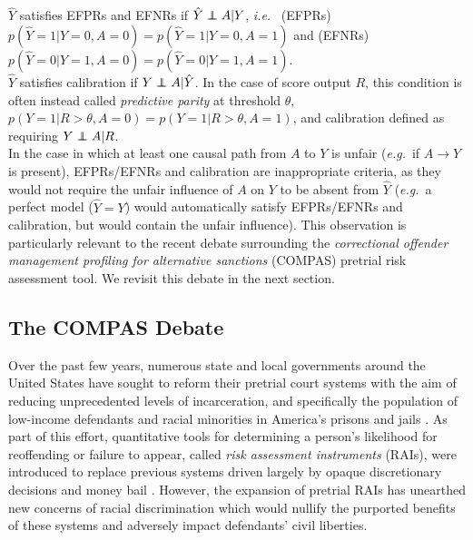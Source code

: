 \documentclass[runningheads]{llncs}
\newcommand\independent{\protect\mathpalette{\protect\independenT}{\perp}}
\def\independenT#1#2{\mathrel{\rlap{$#1#2$}\mkern2mu{#1#2}}}
\newcommand{\ie}{\emph{i.e.}}
\newcommand{\eg}{\emph{e.g.}}
\begin{document}
 $\hat Y$ satisfies EFPRs and EFNRs if $\hat Y \independent A | Y$, \ie~ (EFPRs) $p(\hat Y=1|Y=0,A=0)=p(\hat Y=1|Y=0,A=1)$ and (EFNRs) $p(\hat Y=0|Y=1,A=0)=p(\hat Y=0|Y=1,A=1)$.\\ 

$\hat Y$ satisfies calibration if $Y \independent A | \hat Y$. In the case of score output $R$, this condition is often instead called \emph{predictive parity} at threshold $\theta$, $p(Y=1|R>\theta,A=0)=p(Y=1|R>\theta,A=1)$, and calibration defined as requiring $Y \independent A |R$.\\

In the case in which at least one causal path from $A$ to $Y$ is unfair (\eg~if $A\rightarrow Y$ is present), 
EFPRs/EFNRs and calibration are inappropriate criteria, as they would not require the unfair influence of $A$ on $Y$ to be absent from $\hat Y$ (\eg~a perfect model ($\hat Y = Y$) would automatically satisfy EFPRs/EFNRs and calibration, but would contain the unfair influence). This observation is particularly relevant to the recent debate surrounding the \emph{correctional offender management profiling for alternative sanctions} (COMPAS) pretrial risk assessment tool. We revisit this debate in the next section.

\subsection{The COMPAS Debate \label{sec:COMPAS}}
Over the past few years, numerous state and local governments around the United States have sought to reform their pretrial court systems with the aim of reducing unprecedented levels of incarceration, and specifically the population of low-income defendants and racial minorities in America's prisons and jails \cite{alexander12new,flores16fpr,koepke17danger}. As part of this effort, quantitative tools for determining a person's likelihood for reoffending or failure to appear, called \emph{risk assessment instruments} (RAIs), were introduced to replace previous systems driven largely by opaque discretionary decisions and money bail \cite{arnold18racial,hls18bail}. However, the expansion of pretrial RAIs has unearthed new concerns of racial discrimination which would nullify the purported benefits of these systems and adversely impact defendants' civil liberties.
\end{document}
